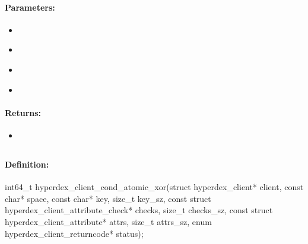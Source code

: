 \paragraph{Parameters:}
\begin{itemize}[noitemsep]
\item {}\\

\item {}\\

\item {}\\

\item {}\\

\end{itemize}

\paragraph{Returns:}
\begin{itemize}[noitemsep]
\item {}\\

\end{itemize}

\pagebreak
\subsection{}
\label{api:c:cond_atomic_xor}


\paragraph{Definition:}
\begin{ccode}
int64_t hyperdex_client_cond_atomic_xor(struct hyperdex_client* client,
        const char* space,
        const char* key, size_t key_sz,
        const struct hyperdex_client_attribute_check* checks, size_t checks_sz,
        const struct hyperdex_client_attribute* attrs, size_t attrs_sz,
        enum hyperdex_client_returncode* status);
\end{ccode}


